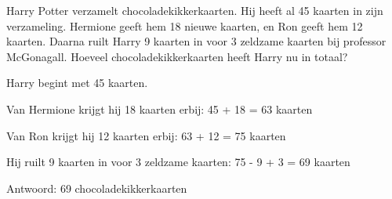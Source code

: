 \begin{opgave}
Harry Potter verzamelt chocoladekikkerkaarten. Hij heeft al 45 kaarten in zijn 
verzameling. Hermione geeft hem 18 nieuwe kaarten, en Ron geeft hem 12 kaarten. 
Daarna ruilt Harry 9 kaarten in voor 3 zeldzame kaarten bij professor McGonagall. 
Hoeveel chocoladekikkerkaarten heeft Harry nu in totaal?
\end{opgave}

\begin{oplossing}
Harry begint met 45 kaarten.

Van Hermione krijgt hij 18 kaarten erbij:
45 + 18 = 63 kaarten

Van Ron krijgt hij 12 kaarten erbij:
63 + 12 = 75 kaarten

Hij ruilt 9 kaarten in voor 3 zeldzame kaarten:
75 - 9 + 3 = 69 kaarten

Antwoord: 69 chocoladekikkerkaarten
\end{oplossing}